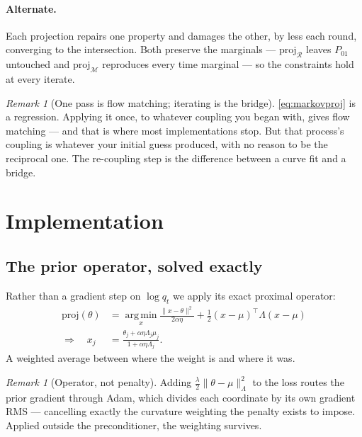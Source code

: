 \documentclass[11pt]{article}
\theoremstyle{definition}
\theoremstyle{plain}
\theoremstyle{remark}
\newtheorem{remark}[definition]{Remark}
\newcommand{\Mcal}{\mathcal{M}}
\newcommand{\Rcal}{\mathcal{R}}
\newcommand{\proj}{\mathrm{proj}}
\begin{document}
\paragraph{Alternate.}
Each projection repairs one property and damages the other, by less each round,
converging to the intersection. Both preserve the marginals --- $\proj_\Rcal$
leaves $P_{01}$ untouched and $\proj_\Mcal$ reproduces every time marginal ---
so the constraints hold at every iterate.

\begin{remark}[One pass is flow matching; iterating is the bridge]
\eqref{eq:markovproj} is a regression. Applying it once, to whatever coupling
you began with, gives flow matching \cite{flowmatch} --- and that is where most
implementations stop. But that process's coupling is whatever your initial guess
produced, with no reason to be the reciprocal one. The re-coupling step is the
difference between a curve fit and a bridge.
\end{remark}

\section{Implementation}
\label{sec:implementation}

\subsection{The prior operator, solved exactly}

Rather than a gradient step on $\log q_t$ we apply its exact proximal operator:
\begin{align}
\proj(\theta) &= \operatorname*{arg\,min}_x \frac{\lVert x-\theta\rVert^2}{2\alpha\eta}
+ \tfrac12 (x-\mu)^\top \Lambda (x-\mu)
\\
\Longrightarrow\quad x_j &= \frac{\theta_j + \alpha\eta\Lambda_j \mu_j}{1+\alpha\eta\Lambda_j} .
\label{eq:prox}
\end{align}
A weighted average between where the weight is and where it was.

\begin{remark}[Operator, not penalty]
Adding $\tfrac{\lambda}{2}\lVert\theta-\mu\rVert^2_\Lambda$ to the loss routes
the prior gradient through Adam, which divides each coordinate by its own
gradient RMS --- cancelling exactly the curvature weighting the penalty exists
to impose. Applied outside the preconditioner, the weighting survives.
\end{remark}
\end{document}
